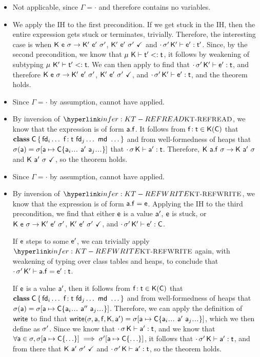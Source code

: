 \documentclass[acmlarge, anonymous, authordraft]{acmart}
\begin{document}
\begin{itemize}
  \item {}
        Not applicable, since $\Gamma = \cdot$ and therefore contains no variables.
  \item {}
        We apply the IH to the first precondition. If we get stuck in the IH, then the entire
        expression gets stuck or terminates, trivially. Therefore, the interesting case is when
        $\Reduce \K\e\s \Kp\ep\sp$, $\WFp\Kp{\ep~\sp}$ and $\EnvType\cdot\sp\Kp\ep\tp$. Since, by the
        second precondition, we know that $\StrSub \M\K \tp \t$, it follows by weakening of subtyping $\StrSub\M\Kp\tp\t$.
        We can then apply  to find that $\EnvType\cdot\sp\Kp\ep\t$, and therefore $\Reduce\K\e\s\Kp\ep\sp$, $\WFp\Kp{\ep~\sp}$, and $\EnvType\cdot\sp\Kp\ep\t$, and the theorem holds.
  \item {}
        Since $\Gamma = \cdot$ by assumption,  cannot have applied.
  \item {}
        By inversion of $\RuleRef{KT-REFREAD}$, we know that the expression is of form $\FReadR\a\f$. It follows from $\Fdef\f\t \in \App\K\C$ that $\Class\C{\fd_i \ldots~\Fdef\f\t ~ \fd_j \ldots}{\md~\ldots}$ and from well-formedness of heaps that $\App\sigma\a = \Map\s{\Bind{\a}{\obj\C{\a_i\dots ~\ap~ \a_j\dots}}}$ that $\EnvType\cdot\s\K\ap\t$. Therefore, $\Reduce\K{\FReadR\a\f}\s\K\ap\s$ and $\WFp\K{\ap~\s}$, so the theorem holds.
  \item {}
        Since $\Gamma = \cdot$ by assumption,  cannot have applied.
  \item {}
        By inversion of $\RuleRef{KT-REFWRITE}$, we know that the expression is of form $\FWriteR\a\f\e$. Applying the IH to the third precondition, we find that either $\e$ is a value $\ap$, $\e$ is stuck, or $\Reduce\K\e\s\Kp\ep\sp$, $\WFp\Kp{\ep~\sp}$, and $\EnvType\cdot\sp\Kp\ep\C$. 

        If $\e$ steps to some $\ep$, we can trivially apply $\RuleRef{KT-REFWRITE}$ again, with weakening of typing over class tables and heaps, to conclude that $\EnvType\cdot\sp\Kp{\FWriteR\a\f\ep}\t$.

        If $\e$ is a value $\ap$, then it follows from $\Fdef\f\t \in \App\K\C$ that $\Class\C{\fd_i \ldots~\Fdef\f\t ~ \fd_j \ldots}{\md~\ldots}$ and from well-formedness of heaps that $\App\sigma\a = \Map\s{\Bind{\a}{\obj\C{\a_i\dots ~\app~ \a_j\dots}}}$. Therefore, we can apply the definition of $\xt{write}$ to find that $\setf\s\a\f\K\ap = \Map\s{\Bind{\a}{\obj\C{\a_i\dots ~\ap~ \a_j\dots}}}$, which we then define as $\sp$. Since we know that $\EnvType\cdot\s\K\ap\t$, and we know that $\forall \a \in \sigma, \Map\s{\Bind{\a}{\obj\C{\ldots}}} \implies \Map\sp{\Bind\a{\obj\C{\ldots}}}$, it follows that $\EnvType\cdot\sp\K\ap\t$, and from there that $\WFp\K{\ap~\sp}$ and $\EnvType\cdot\sp\K\ap\t$, so the theorem holds.


\end{itemize}
\end{document}
